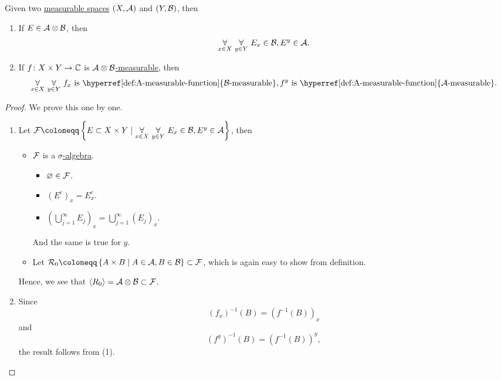\begin{proposition}
	Given two \hyperref[def:measurable-space]{measurable spaces} \((X, \mathcal{\MakeUppercase{a}} )\) and \((Y, \mathcal{\MakeUppercase{b}} )\), then
	\begin{enumerate}[(1)]
		\item If \(E\in \mathcal{\MakeUppercase{a}} \otimes \mathcal{\MakeUppercase{b}}\), then
		      \[
			      \underset{x\in X}{\forall }\ \underset{y\in Y}{\forall }\ E_x\in \mathcal{\MakeUppercase{b}} , E^y\in \mathcal{\MakeUppercase{a}}.
		      \]
		\item If \(f\colon X\times Y\to \mathbb{\MakeUppercase{c}} \) is \hyperref[def:A-measurable-function]{\(\mathcal{\MakeUppercase{a}} \otimes \mathcal{\MakeUppercase{b}} \)-measurable}, then
		      \[
			      \underset{x\in X}{\forall }\ \underset{y\in Y}{\forall }\ f_x \text{ is \hyperref[def:A-measurable-function]{\(\mathcal{\MakeUppercase{b}}\)-measurable}}, f^y \text{ is \hyperref[def:A-measurable-function]{\(\mathcal{\MakeUppercase{a}}\)-measurable}}.
		      \]
	\end{enumerate}
\end{proposition}
\begin{proof}
	We prove this one by one.
	\begin{enumerate}[(1)]
		\item Let \(\mathcal{\MakeUppercase{f}} \coloneqq \left\{E\subset X\times Y \mid \underset{x\in X}{\forall }\ \underset{y\in Y}{\forall }\ E_x\in \mathcal{\MakeUppercase{b}} , E^y\in \mathcal{\MakeUppercase{a}}\right\}\), then
		      \begin{itemize}
			      \item \(\mathcal{\MakeUppercase{f}} \) is a \hyperref[def:sigma-algebra]{\(\sigma\)-algebra}.
			            \begin{itemize}
				            \item \(\varnothing \in \mathcal{\MakeUppercase{f}} \).
				            \item \((E^{c} )_x = E_{x}^{c}\).
				            \item \(\left(\bigcup\limits_{j=1}^{\infty} E_{j} \right)_x = \bigcup\limits_{j=1}^{\infty} (E_{j} )_{x} \).
			            \end{itemize}
			            And the same is true for \(y\).
			      \item Let \(\mathcal{\MakeUppercase{r}} _0 \coloneqq \left\{A\times B \mid A\in \mathcal{\MakeUppercase{a}} , B\in \mathcal{\MakeUppercase{b}} \right\}\subset \mathcal{\MakeUppercase{f}}\), which is again
			            easy to show from definition.
		      \end{itemize}
		      Hence, we see that \(\left< R_0 \right> = \mathcal{\MakeUppercase{a}} \otimes \mathcal{\MakeUppercase{b}} \subset \mathcal{\MakeUppercase{f}} \).
		\item Since
		      \[
			      (f_{x} )^{-1} (B) = (f^{-1} (B))_{x}
		      \]
		      and
		      \[
			      (f^{y} )^{-1} ({B} ) = (f^{-1} (B))^{y},
		      \]
		      the result follows from (1).
	\end{enumerate}
\end{proof}

